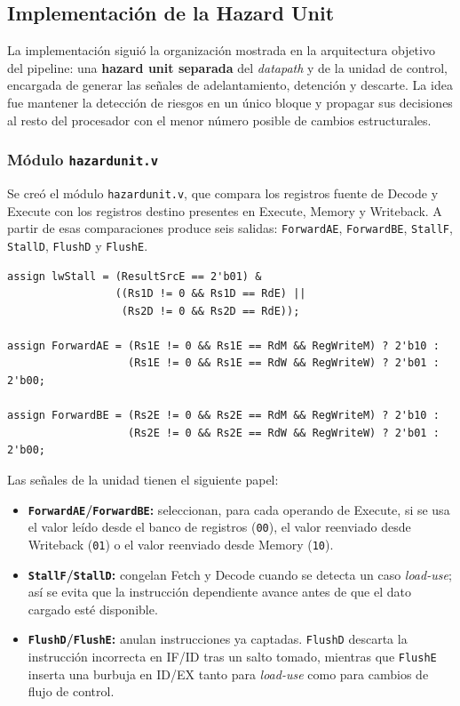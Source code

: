 \documentclass[11pt,a4paper]{article}
\begin{document}
\subsection{Implementación de la Hazard Unit}

La implementación siguió la organización mostrada en la arquitectura objetivo del
pipeline: una \textbf{hazard unit separada} del \textit{datapath} y de la unidad de
control, encargada de generar las señales de adelantamiento, detención y descarte. La
idea fue mantener la detección de riesgos en un único bloque y propagar sus decisiones al
resto del procesador con el menor número posible de cambios estructurales.

\subsubsection{Módulo \texttt{hazardunit.v}}

Se creó el módulo \texttt{hazardunit.v}, que compara los registros fuente de Decode y
Execute con los registros destino presentes en Execute, Memory y Writeback. A partir de
esas comparaciones produce seis salidas: \texttt{ForwardAE}, \texttt{ForwardBE},
\texttt{StallF}, \texttt{StallD}, \texttt{FlushD} y \texttt{FlushE}.

\begin{lstlisting}
assign lwStall = (ResultSrcE == 2'b01) &
                 ((Rs1D != 0 && Rs1D == RdE) ||
                  (Rs2D != 0 && Rs2D == RdE));

assign ForwardAE = (Rs1E != 0 && Rs1E == RdM && RegWriteM) ? 2'b10 :
                   (Rs1E != 0 && Rs1E == RdW && RegWriteW) ? 2'b01 : 2'b00;

assign ForwardBE = (Rs2E != 0 && Rs2E == RdM && RegWriteM) ? 2'b10 :
                   (Rs2E != 0 && Rs2E == RdW && RegWriteW) ? 2'b01 : 2'b00;
\end{lstlisting}

Las señales de la unidad tienen el siguiente papel:

\begin{itemize}
	\item \textbf{\texttt{ForwardAE}/\texttt{ForwardBE}:} seleccionan, para cada operando
	      de Execute, si se usa el valor leído desde el banco de registros
	      (\texttt{00}), el valor reenviado desde Writeback (\texttt{01}) o el valor
	      reenviado desde Memory (\texttt{10}).
	\item \textbf{\texttt{StallF}/\texttt{StallD}:} congelan Fetch y Decode cuando se
	      detecta un caso \textit{load-use}; así se evita que la instrucción dependiente
	      avance antes de que el dato cargado esté disponible.
	\item \textbf{\texttt{FlushD}/\texttt{FlushE}:} anulan instrucciones ya captadas.
	      \texttt{FlushD} descarta la instrucción incorrecta en IF/ID tras un salto tomado,
	      mientras que \texttt{FlushE} inserta una burbuja en ID/EX tanto para \textit{load-use}
	      como para cambios de flujo de control.
\end{itemize}
\end{document}
